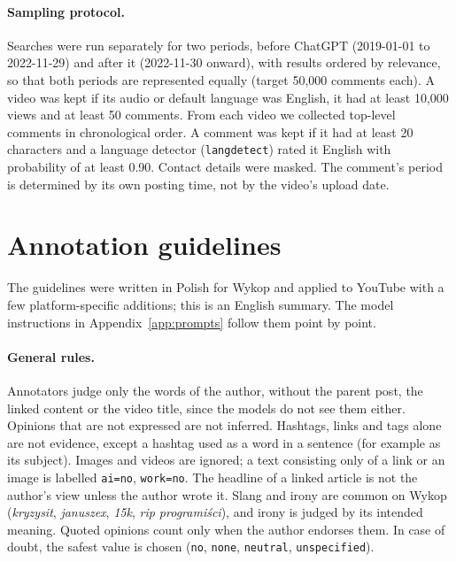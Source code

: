 \documentclass[11pt]{article}
\begin{document}
\paragraph{Sampling protocol.}
Searches were run separately for two periods, before ChatGPT
(2019-01-01 to 2022-11-29) and after it (2022-11-30 onward), with results
ordered by relevance, so that both periods are represented equally (target
50{,}000 comments each). A video was kept if its audio or default language was
English, it had at least 10{,}000 views and at least 50 comments. From each
video we collected top-level comments in chronological order. A comment was
kept if it had at least 20 characters and a language detector
(\texttt{langdetect}) rated it English with probability of at least 0.90.
Contact details were masked. The comment's period is determined by its own
posting time, not by the video's upload date.


\section{Annotation guidelines}
\label{app:guidelines}

The guidelines were written in Polish for Wykop and applied to YouTube with a
few platform-specific additions; this is an English summary. The model
instructions in Appendix~\ref{app:prompts} follow them point by point.

\paragraph{General rules.} Annotators judge only the words of the author,
without the parent post, the linked content or the video title, since the
models do not see them either. Opinions that are not expressed are not
inferred. Hashtags, links and tags alone are not evidence, except a hashtag
used as a word in a sentence (for example as its subject). Images and videos
are ignored; a text consisting only of a link or an image is labelled
\texttt{ai=no}, \texttt{work=no}. The headline of a linked article is not the
author's view unless the author wrote it. Slang and irony are common on Wykop
(\textit{kryzysit}, \textit{januszex}, \textit{15k}, \textit{rip
programiści}), and irony is judged by its intended meaning. Quoted opinions
count only when the author endorses them. In case of doubt, the safest value
is chosen (\texttt{no}, \texttt{none}, \texttt{neutral},
\texttt{unspecified}).
\end{document}
